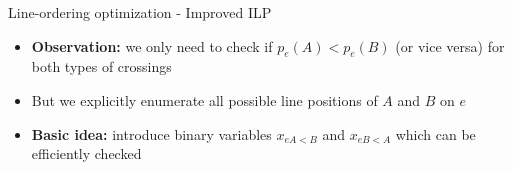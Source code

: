 \documentclass{beamer}
\begin{document}
\begin{frame}[t]{Line-ordering optimization - Improved ILP}
	\vspace{1cm}%
	\begin{itemize}[<+->]
		\item \textbf{Observation:} we only need to check if $p_e(A) < p_e(B)$ (or vice versa) for both types of crossings
		\item But we explicitly enumerate all possible line positions of $A$ and $B$ on $e$
		\item \alert{\textbf{Basic idea:}} introduce binary variables $x_{eA<B}$ and $x_{eB<A}$ which can be efficiently checked
	\end{itemize}
	\vspace{0.5cm}%
\end{frame}
\end{document}
